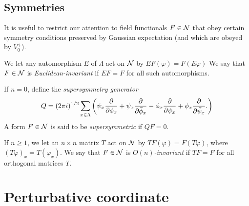 \subsection{Symmetries}

It is useful to restrict our attention to field functionals $F \in \mathcal{N}$ that
obey certain symmetry conditions preserved by Gaussian expectation (and which
are obeyed by $V^+_0$).

We let any automorphism $E$ of $\Lambda$ act on $\mathcal{N}$ by $EF(\varphi) = F(E\varphi)$
We say that $F\in\mathcal{N}$ is \emph{Euclidean-invariant} if $EF = F$ for all such automorphisms.

If $n = 0$,  define the \emph{supersymmetry generator}
\begin{equation}
Q = (2\pi i)^{1/2} \sum_{x\in\Lambda}
\left(
	\psi_x \frac{\partial }{\partial \phi_x} + \bar\psi_x \frac{\partial }{\partial \bar\phi_x}
		-
	\phi_x \frac{\partial }{\partial \psi_x} + \bar\phi_x \frac{\partial }{\partial \bar\psi_x}.
\right)
\end{equation}
A form $F \in \mathcal{N}$ is said to be \emph{supersymmetric} if $Q F = 0$.

If $n \ge 1$, we let
an $n \times n$ matrix $T$ act on $\mathcal{N}$ by $T F(\varphi) = F(T \varphi)$,
where $(T\varphi)_x = T(\varphi_x)$.
We say that $F\in\mathcal{N}$ is \emph{$O(n)$-invariant} if $TF = F$ for all
orthogonal matrices $T$.



\section{Perturbative coordinate}

